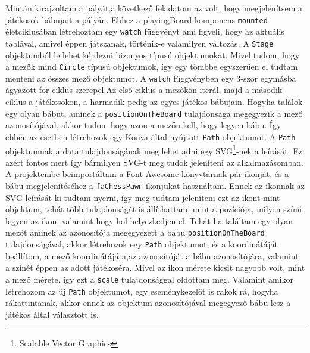 \documentclass[a4paper,twoside]{article}
\begin{document}
Miután kirajzoltam a pályát,a következő feladatom az volt, hogy megjelenítsem a játékosok bábujait a pályán. Ehhez a playingBoard komponens  \verb|mounted| életciklusában létrehoztam egy \verb|watch| függvényt ami figyeli, hogy az aktuális táblával, amivel éppen játszanak, történik-e valamilyen változás. A \verb|Stage| objektumból le lehet kérdezni bizonyos típusú objektumokat. Mivel tudom, hogy a mezők mind \verb|Circle| típusú objektumok, így egy tömbbe egyszerűen el tudtam menteni az összes mező objektumot. A \verb|watch| függvényben egy 3-szor egymásba ágyazott for-ciklus szerepel.Az első ciklus a mezőkön iterál, majd a második ciklus a játékosokon, a harmadik pedig az egyes játékos bábujain. Hogyha találok egy olyan bábut, aminek a \verb|positionOnTheBoard| tulajdonsága megegyezik a mező azonosítójával, akkor tudom hogy azon a mezőn kell, hogy legyen bábu. Így ebben az esetben létrehozok egy Konva által nyújtott \verb|Path| objektumot. A \verb|Path| objektumnak a data tulajdonságának meg lehet adni egy SVG\footnote{Scalable Vector Graphics}-nek a leírását. Ez azért fontos mert így bármilyen SVG-t meg tudok jeleníteni az alkalmazásomban. A projektembe beimportáltam a Font-Awesome\cite{fontawesome} könyvtárnak pár ikonját, és a bábu megjelenítéséhez a \verb|faChessPawn| ikonjukat használtam. Ennek az ikonnak az SVG leírását ki tudtam nyerni, így meg tudtam jeleníteni ezt az ikont mint objektum, tehát több tulajdonságát is állíthattam, mint a pozíciója, milyen színű legyen az ikon, valamint hogy hol helyezkedjen el. Tehát ha találtam egy olyan mezőt aminek az azonosítója megegyezett a bábu \verb|positionOnTheBoard| tulajdonságával, akkor létrehozok egy \verb|Path| objektumot, és a koordinátáját beállítom, a mező koordinátájára,az azonosítóját a bábu azonosítójára, valamint a színét éppen az adott játékoséra. Mivel az ikon mérete kicsit nagyobb volt, mint a mező mérete, így ezt a \verb|scale| tulajdonsággal oldottam meg. Valamint amikor létrehozom az új \verb|Path| objektumot, egy eseménykezelőt is rakok rá, hogyha rákattintanak, akkor ennek az objektum azonosítójával megegyező bábu lesz a játékos által választott is. 
\end{document}
